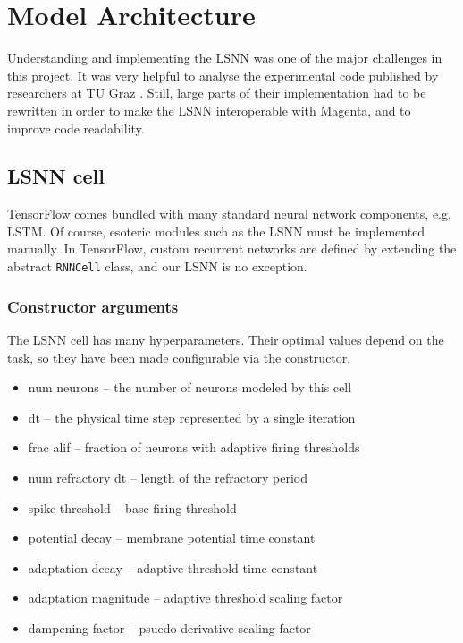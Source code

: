 \documentclass[../../report.tex]{subfiles}
\begin{document}
\section{Model Architecture}

Understanding and implementing the LSNN was one of the major challenges in this
project. It was very helpful to analyse the experimental code published by
researchers at TU Graz \cite{Bellec2018LSNN, Bellec2020}. Still, large parts of
their implementation had to be rewritten in order to make the LSNN interoperable
with Magenta, and to improve code readability.

\subsection{LSNN cell}

TensorFlow comes bundled with many standard neural network components, e.g.
LSTM. Of course, esoteric modules such as the LSNN must be implemented manually.
In TensorFlow, custom recurrent networks are defined by extending the abstract
\texttt{RNNCell} class, and our LSNN is no exception.

\subsubsection{Constructor arguments}
The LSNN cell has many hyperparameters. Their optimal values depend on the task,
so they have been made configurable via the constructor.

\begin{itemize}
  \item num neurons -- the number of neurons modeled by this cell
  \item dt -- the physical time step represented by a single iteration
  \item frac alif -- fraction of neurons with adaptive firing thresholds
  \item num refractory dt -- length of the refractory period
  \item spike threshold -- base firing threshold
  \item potential decay -- membrane potential time constant 
  \item adaptation decay -- adaptive threshold time constant 
  \item adaptation magnitude -- adaptive threshold scaling factor
  \item dampening factor -- psuedo-derivative scaling factor 
\end{itemize}
\end{document}
